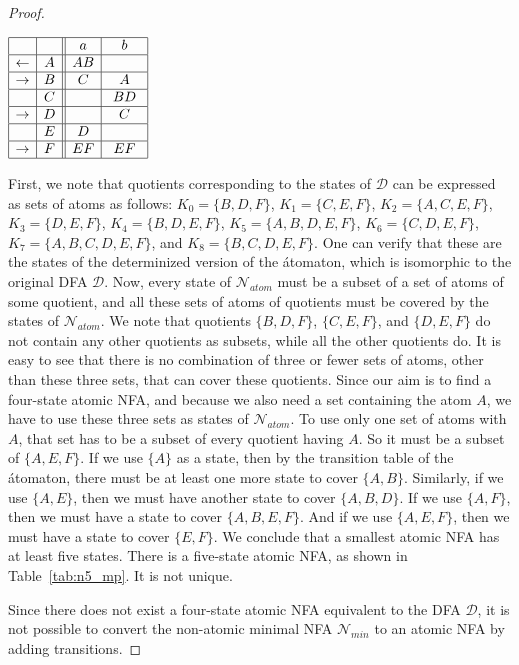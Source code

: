 \documentclass[preprint,12pt]{elsarticle}
\newcommand{\cA}{{\mathcal A}}
\newcommand{\cD}{{\mathcal D}}
\newcommand{\cN}{{\mathcal N}}
\begin{document}
\begin{proof}
\begin{table}[hbt]
\begin{minipage}[b]{0.32\linewidth}
\caption{ $\cA$.}
\label{tab:a_mp}
{\footnotesize
\begin{center}
$
\begin{array}{|c| c||c| c| }    
\hline
&
& a & b    \\
\hline  
\leftarrow & A
& AB &  \\
\hline  
\rightarrow & B
&  C & A  \\
\hline  
 &  C 
&   & \ BD \  \\
\hline  
\rightarrow &  D 
&   & C \\
\hline  
 &  E 
& D  &     \\
\hline  
\rightarrow &  F 
&  EF  &  EF \\
\hline  
\end{array}
$
\end{center}}
\end{minipage}
\end{table}
First, we note that quotients corresponding to the states of $\cD$ can be expressed 
as sets of atoms as follows:
$K_0=\{B,D,F\}$, $K_1=\{C,E,F\}$, $K_2=\{A,C,E,F\}$, $K_3=\{D,E,F\}$,
$K_4=\{B,D,E,F\}$, $K_5=\{A,B,D,E,F\}$, $K_6=\{C,D,E,F\}$, $K_7=\{A,B,C,D,E,F\}$, and
$K_8=\{B,C,D,E,F\}$. One can verify that these are the states of the determinized 
version of the \'atomaton, which is isomorphic to the original DFA $\cD$. 
Now, every state of $\cN_{atom}$ must be a subset of a set of atoms of some quotient, 
and all these sets of atoms of quotients must be covered by the states of $\cN_{atom}$.
We note that quotients $\{B,D,F\}$, $\{C,E,F\}$, and $\{D,E,F\}$
do not contain any other quotients as subsets, while all the other quotients do.
It is easy to see that there is no combination of three or fewer sets of atoms, 
other than these three sets, that can cover these quotients. 
Since our aim is to find a four-state atomic NFA, and because we also need a set 
containing the atom $A$, we have to use these three sets as states of $\cN_{atom}$. 
To use only one set of atoms with $A$, that set has to be
a subset of every quotient having $A$. So it must be
a subset of $\{A,E,F\}$. If we use $\{A\}$ as a state, then by the transition 
table of the \'atomaton, there must be at least one more state to cover 
$\{A,B\}$. Similarly, if we use $\{A,E\}$, then we must have another state to cover 
$\{A,B,D\}$. If we use $\{A,F\}$, then we must have a state to cover 
$\{A,B,E,F\}$. And if we use $\{A,E,F\}$, then we must have a state to cover 
$\{E,F\}$. We conclude that a smallest atomic NFA has at least five states.
There is a five-state atomic NFA, as 
shown in Table~\ref{tab:n5_mp}. It is not unique. 

Since there does not exist a four-state atomic NFA equivalent to the DFA $\cD$,
it is not possible to convert the non-atomic 
minimal NFA $\cN_{min}$ to an atomic NFA by adding transitions.
\end{proof}
\end{document}
